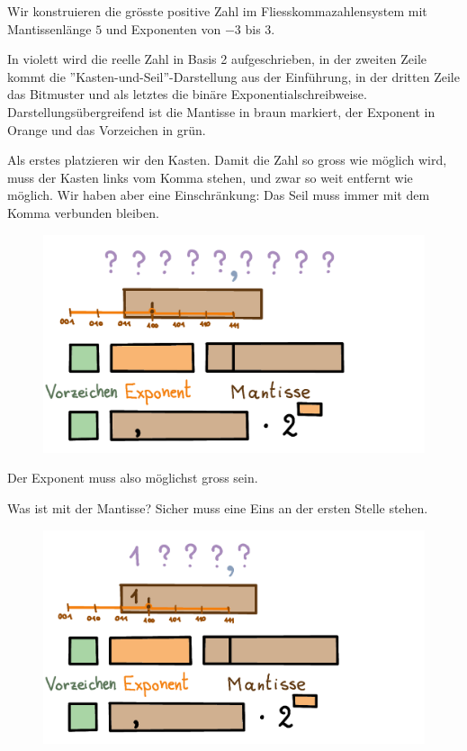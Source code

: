 \begin{beispiel}
Wir konstruieren die grösste positive Zahl im Fliesskommazahlensystem mit Mantissenlänge \(5\) und Exponenten von \(-3\) bis \(3\).

In violett wird die reelle Zahl in Basis 2 aufgeschrieben, in der zweiten Zeile kommt die ''Kasten-und-Seil''-Darstellung aus der Einführung, in der dritten Zeile das Bitmuster und als letztes die binäre Exponentialschreibweise. Darstellungsübergreifend ist die Mantisse in braun markiert, der Exponent in Orange und das Vorzeichen in grün.

Als erstes platzieren wir den Kasten. Damit die Zahl so gross wie möglich wird, muss der Kasten links vom Komma stehen, und zwar so weit entfernt wie möglich. Wir haben aber eine Einschränkung: Das Seil muss immer mit dem Komma verbunden bleiben.
\begin{figure}[H]
\centering
\includegraphics[width=0.85\linewidth]{Pictures/groessteZahl1.png}
\end{figure}
Der Exponent muss also möglichst gross sein.

Was ist mit der Mantisse? Sicher muss eine Eins an der ersten Stelle stehen.
\begin{figure}[H]
\centering
\includegraphics[width=0.85\linewidth]{Pictures/groessteZahl2.png}
\end{figure}


\end{beispiel}
